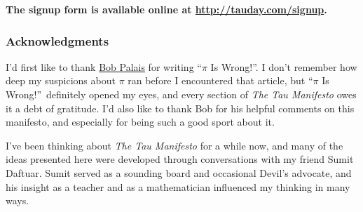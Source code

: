 
\bigskip %
\begin{center} %
\textbf{The signup form is available online at \href{http://tauday.com/signup}{http://tauday.com/signup}.} %
\end{center} %

  \subsubsection{Acknowledgments} %
  \label{sec:acknowledgments}

I'd first like to thank \href{http://www.math.utah.edu/~palais}{Bob Palais} for writing ``$\pi$ Is Wrong!''. I don't remember how deep my suspicions about $\pi$ ran before I encountered that article, but ``$\pi$ Is Wrong!''\ definitely opened my eyes, and every section of \emph{The Tau Manifesto} owes it a debt of gratitude. I'd also like to thank Bob for his helpful comments on this manifesto, and especially for being such a good sport about it.

I've been thinking about \emph{The Tau Manifesto} for a while now, and many of the ideas presented here were developed through conversations with my friend Sumit Daftuar. Sumit served as a sounding board and occasional Devil's advocate, and his insight as a teacher and as a mathematician influenced my thinking in many ways.

